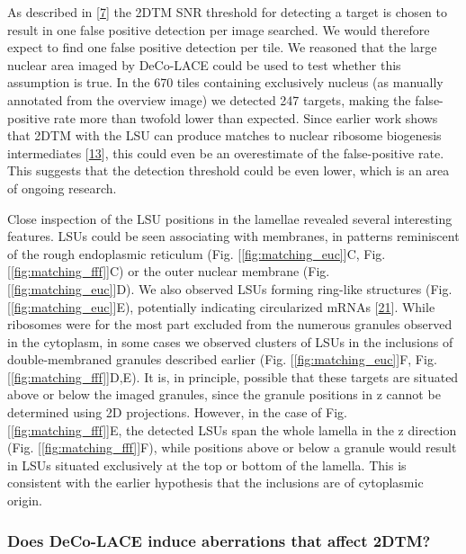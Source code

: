 \documentclass[
]{article}
\begin{document}
As described in {[}\protect\hyperlink{ref-Ynb3IP6I}{7}{]} the 2DTM SNR threshold for
detecting a target is chosen to result in one false positive detection
per image searched. We would therefore expect to find one false positive
detection per tile. We reasoned that the large nuclear area imaged by
DeCo-LACE could be used to test whether this assumption is true. In the
670 tiles containing exclusively nucleus (as manually annotated from the
overview image) we detected 247 targets, making the false-positive rate
more than twofold lower than expected. Since earlier work shows that
2DTM with the LSU can produce matches to nuclear ribosome biogenesis
intermediates {[}\protect\hyperlink{ref-T1Qr0xyP}{13}{]}, this could even be an
overestimate of the false-positive rate. This suggests that the
detection threshold could be even lower, which is an area of ongoing
research.

Close inspection of the LSU positions in the lamellae revealed several
interesting features. LSUs could be seen associating with membranes, in
patterns reminiscent of the rough endoplasmic reticulum (Fig.
{[}\ref{fig:matching_euc}{]}C, Fig. {[}\ref{fig:matching_fff}{]}C) or the outer nuclear
membrane (Fig. {[}\ref{fig:matching_euc}{]}D). We also observed LSUs forming
ring-like structures (Fig. {[}\ref{fig:matching_euc}{]}E), potentially indicating
circularized mRNAs {[}\protect\hyperlink{ref-cie13Q8F}{21}{]}. While ribosomes were for the most
part excluded from the numerous granules observed in the cytoplasm, in
some cases we observed clusters of LSUs in the inclusions of
double-membraned granules described earlier (Fig. {[}\ref{fig:matching_euc}{]}F,
Fig. {[}\ref{fig:matching_fff}{]}D,E). It is, in principle, possible that these
targets are situated above or below the imaged granules, since the
granule positions in z cannot be determined using 2D projections.
However, in the case of Fig. {[}\ref{fig:matching_fff}{]}E, the detected LSUs
span the whole lamella in the z direction (Fig. {[}\ref{fig:matching_fff}{]}F),
while positions above or below a granule would result in LSUs situated
exclusively at the top or bottom of the lamella. This is consistent with
the earlier hypothesis that the inclusions are of cytoplasmic origin.

\hypertarget{does-deco-lace-induce-aberrations-that-affect-2dtm}{%
\subsubsection{Does DeCo-LACE induce aberrations that affect 2DTM?}\label{does-deco-lace-induce-aberrations-that-affect-2dtm}}
\end{document}
